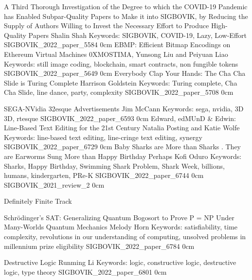 \addpaper
    {A Third Thorough Investigation of the Degree to which the COVID-19 Pandemic has Enabled Subpar-Quality Papers to Make it into SIGBOVIK, by Reducing the Supply of Authors Willing to Invest the Necessary Effort to Produce High-Quality Papers}
    {Shalin Shah}
    {Keywords: SIGBOVIK, COVID-19, Lazy, Low-Effort}
    {SIGBOVIK_2022_paper_5584}
    {0cm}
    {}
\addpaper
    {EBMP: Efficient Bitmap Encodings on Ethereum Virtual Machines}
    {0XMOSTIMA, Yunsong Liu and Peiyuan Liao}
    {Keywords: still image coding, blockchain, smart contracts, non fungible tokens}
    {SIGBOVIK_2022_paper_5649}
    {0cm}
    {}
\addpaper
    {Everybody Clap Your Hands: The Cha Cha Slide is Turing Complete}
    {Harrison Goldstein}
    {Keywords: Turing complete, Cha Cha Slide, line dance, party, complexity}
    {SIGBOVIK_2022_paper_5708}
    {0cm}
    {}

\addpaper
    {SEGA-NVidia 32esque Advertisements}
    {Jim McCann}
    {Keywords: sega, nvidia, 3D 3D, rtesque}
    {SIGBOVIK_2022_paper_6593}
    {0cm}
    {}
\addpaper
    {Edward, edMUnD & Edwin: Line-Based Text Editing for the 21st Century}
    {Natalia Posting and Katie Wolfe}
    {Keywords: line-based text editing, line-cringe text editing, synergy}
    {SIGBOVIK_2022_paper_6729}
    {0cm}
    {}
\addpaper
    {Baby Sharks are More than Sharks . They are Earworms Sung More than Happy Birthday Perhaps}
    {Kofi Oduro}
    {Keywords: Sharks, Happy Birthday, Swimming Shark Problem, Shark Week, billions, humans, kindergarten, PRe-K}
    {SIGBOVIK_2022_paper_6744}
    {0cm}
    {}
\addreview
    {SIGBOVIK_2021_review_2}
    {0cm}



\addtrack
    {}{Definitely Finite Track}


\addpaper
    {Schrödinger’s SAT: Generalizing Quantum Bogosort to Prove P = NP Under Many-Worlds Quantum Mechanics}
    {Melody Horn}
    {Keywords: satisfiability, time complexity, revolutions in our understanding of computing, unsolved problems in millennium prize eligibility}
    {SIGBOVIK_2022_paper_6784}
    {0cm}
    {}

\addpaper
    {Destructive Logic}
    {Runming Li}
    {Keywords: logic, constructive logic, destructive logic, type theory}
    {SIGBOVIK_2022_paper_6801}
    {0cm}
    {}

